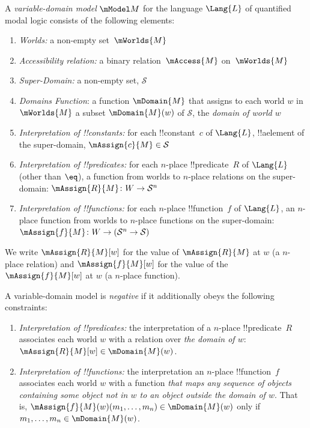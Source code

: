 \documentclass[../../../include/open-logic-section]{subfiles}
\begin{document}
\begin{defn}
    A \emph{variable-domain model} $\mModel M$ for the language $\Lang{L}$ 
    of quantified modal logic consists of the following elements:
    \begin{enumerate}
    \item \emph{Worlds:} a non-empty set~$\mWorlds{M}$
    \item \emph{Accessibility relation:} a binary relation~$\mAccess{M}$ on~$\mWorlds{M}$
    \item \emph{Super-Domain:} a non-empty set, $\mathcal{S}$
    \item \emph{Domains Function}: a function $\mDomain{M}$ that assigns
    to each world $w$ in $\mWorlds{M}$ a subset $\mDomain{M}(w)$ of $\mathcal{S}$, the \emph{domain of world $w$}
\item \emph{Interpretation of !!{constant}s:} for each !!{constant}~$c$ of
  $\Lang{L}$, !!a{element} of the super-domain, $\mAssign{c}{M} \in \mathcal{S}$
\item \emph{Interpretation of !!{predicate}s:} for each $n$-place
  !!{predicate}~$R$ of $\Lang{L}$ (other than $\eq$), a function 
  from worlds to $n$-place
  relations on the super-domain: $\mAssign{R}{M} \colon W \to \mathcal{S}^n$
\item \emph{Interpretation of !!{function}s:} for each $n$-place
  !!{function}~$f$ of $\Lang{L}$, an $n$-place function from worlds 
  to $n$-place functions on the super-domain: $\mAssign{f}{M} \colon W \to 
  (\mathcal{S}^n \to \mathcal{S})$

\end{enumerate}

We write $\mAssign{R}{M}[w]$ for the value of $\mAssign{R}{M}$ at $w$ (a $n$-place relation) and $\mAssign{f}{M}[w]$ for the value of the 
$\mAssign{f}{M}[w]$ at $w$ (a $n$-place function). 
\end{defn}

\begin{defn}
  A variable-domain model is \emph{negative} if it additionally 
  obeys the following constraints:
  \begin{enumerate}
    \item \emph{Interpretation of !!{predicate}s:} the interpretation
    of a $n$-place !!{predicate}~$R$ associates each world $w$ with a
    relation over \emph{the domain of $w$}: $\mAssign{R}{M}[w]\in
    \mDomain{M}(w)$. 
  \item \emph{Interpretation of !!{function}s:} the interpretation 
    an $n$-place !!{function}~$f$ associates each world $w$ with a 
    function \emph{that maps any sequence of objects
    containing some object not in $w$ to an object outside the domain 
    of $w$}. That is, $\mAssign{f}{M}(w)(m_1,\ldots,m_n)\in \mDomain{M}(w)$
    only if $m_1,\ldots,m_n\in \mDomain{M}(w)$.
  \end{enumerate}
\end{defn}
\end{document}
